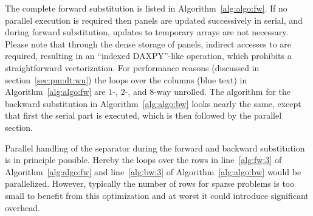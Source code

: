 %
%
%
%
%
%


The complete forward substitution is listed in Algorithm~\ref{alg:algo:fw}.
If no parallel execution is required then panels are updated successively in
serial, and during forward substitution, updates to temporary arrays are not
necessary.
Please note that through the dense storage of panels, indirect accesses to \vr{}
are required, resulting in an ``indexed DAXPY''-like operation, which prohibits a
straightforward vectorization.
For performance reasons (discussed in section~\ref{sec:pm:dt:wu}) the
loops over the columns (blue text) in Algorithm~\ref{alg:algo:fw} are $1$-,
$2$-, and $8$-way unrolled.
The algorithm for the backward substitution in Algorithm~\ref{alg:algo:bw} 
looks nearly the same, except that first
the serial part is executed, which is then followed by the parallel section.
%

Parallel handling of the separator during the forward and backward
substitution is in principle possible.
Hereby the loops over the rows in line~\ref{alg:fw:3} of Algorithm~\ref{alg:algo:fw}
and line~\ref{alg:bw:3} of Algorithm~\ref{alg:algo:bw} would be parallelized.
However, typically the number of rows for sparse problems is too small to
benefit from this optimization and at worst it could introduce significant
overhead.

